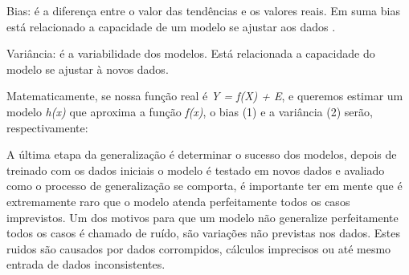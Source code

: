 \begin{alineas}
	\item Bias: é a diferença entre o valor das tendências e os valores reais. Em suma bias está relacionado a capacidade de um modelo
				se ajustar aos dados .
	\item Variância: é a variabilidade dos modelos. Está relacionada a capacidade do modelo se ajustar à novos dados.  
\end{alineas}   

Matematicamente, se nossa função real é \textit{Y = f(X) + E}, e queremos estimar um modelo \textit{h(x)} que aproxima a função \textit{f(x)},
o bias (1) e a variância (2) serão, respectivamente:
\begin{figure}[h!]
	\centering
\end{figure}


A última etapa da generalização é determinar o sucesso dos modelos, depois de treinado com os dados iniciais
o modelo é testado em novos dados e avaliado como o processo de generalização se comporta, é importante ter em mente que é extremamente raro
que o modelo atenda perfeitamente todos os casos imprevistos.
Um dos motivos para que um modelo não generalize perfeitamente todos os casos é chamado de ruído, são variações não previstas nos dados.
Estes ruidos são causados por dados corrompidos, cálculos imprecisos ou até mesmo entrada de dados inconsistentes.









 